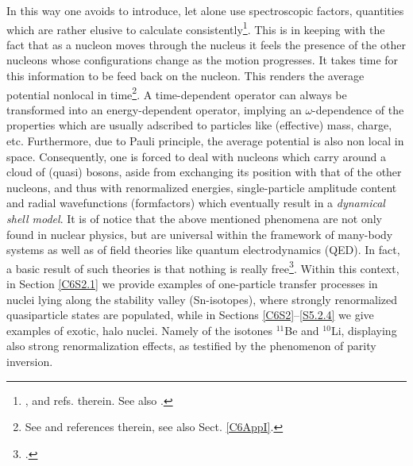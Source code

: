 In this way one avoids to introduce, let alone use spectroscopic factors, quantities which are rather elusive to calculate consistently\footnote{\cite{Duguet:12,Jenning:11,Dickhoff:04,Dickhoff:05}, and refs. therein. See also \cite{Feshbach:92,Tamura:74,Tamura:80}.}. This is in keeping with the fact that as a nucleon moves through the nucleus it feels the presence of the other nucleons whose configurations change as the motion progresses. It takes time for this information to be feed back on the nucleon. This renders the average potential nonlocal in time\footnote{See \citet{Mahaux:85} and references therein, see also Sect. \ref{C6AppI}.}. A time-dependent operator can always be transformed into an energy-dependent operator, implying an $\omega$-dependence of the properties which are usually adscribed to particles like (effective) mass, charge, etc. Furthermore, due to  Pauli principle, the average potential is also non local in space.  Consequently, one is forced to deal with nucleons which carry around a cloud of (quasi) bosons, aside from  exchanging its position with that of the other nucleons, and thus with renormalized energies, single-particle amplitude content and radial wavefunctions (formfactors) which eventually result in a \textit{dynamical shell model}.  It is of notice that the above mentioned phenomena are not only found in nuclear physics, but are universal within the framework of many-body systems as well as of field theories like quantum electrodynamics (QED). In fact, a basic result of such theories is that nothing is really free\footnote{\cite{Feynman:75}.}.  Within this context, in Section \ref{C6S2.1} we provide examples of one-particle transfer processes in nuclei lying along the stability valley (Sn-isotopes), where strongly renormalized quasiparticle states are populated, while in 
 Sections \ref{C6S2}--\ref{S5.2.4} we give examples of exotic, halo nuclei.   Namely of the isotones $^{11}$Be and $^{10}$Li, displaying also strong renormalization effects, as testified by  the   phenomenon of parity inversion. 


